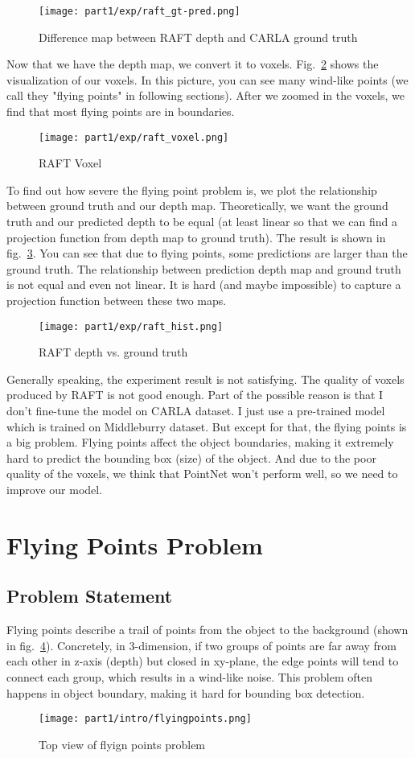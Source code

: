 \documentclass[12pt]{article}
\begin{document}
\begin{figure}[H]
    \centering
    \texttt{[image: part1/exp/raft\_gt-pred.png]}
    \caption{Difference map between RAFT depth and CARLA ground truth}
    \label{raft_gt-pred}
\end{figure}
Now that we have the depth map, we convert it to voxels. Fig.~\ref{raft_voxel} shows the visualization of our voxels. In this picture, you can see many wind-like points (we call they "flying points" in following sections). After we zoomed in the voxels, we find that most flying points are in boundaries.
\begin{figure}[H]
    \centering
    \texttt{[image: part1/exp/raft\_voxel.png]}
    \caption{RAFT Voxel}
    \label{raft_voxel}
\end{figure}
To find out how severe the flying point problem is, we plot the relationship between ground truth and our depth map. Theoretically, we want the ground truth and our predicted depth to be equal (at least linear so that we can find a projection function from depth map to ground truth). The result is shown in fig.~\ref{raft_hist}. You can see that due to flying points, some predictions are larger than the ground truth. The relationship between prediction depth map and ground truth is not equal and even not linear. It is hard (and maybe impossible) to capture a projection function between these two maps.
\begin{figure}[H]
    \centering
    \texttt{[image: part1/exp/raft\_hist.png]}
    \caption{RAFT depth vs. ground truth}
    \label{raft_hist}
\end{figure}
Generally speaking, the experiment result is not satisfying. The quality of voxels produced by RAFT is not good enough. Part of the possible reason is that I don’t fine-tune the model on CARLA dataset. I just use a pre-trained model which is trained on Middleburry dataset. But except for that, the flying points is a big problem. Flying points affect the object boundaries, making it extremely hard to predict the bounding box (size) of the object. And due to the poor quality of the voxels, we think that PointNet won't perform well, so we need to improve our model.
\section{Flying Points Problem}
\subsection{Problem Statement}
Flying points describe a trail of points from the object to the background (shown in fig.~\ref{flyingpoints}). Concretely, in 3-dimension, if two groups of points are far away from each other in z-axis (depth) but closed in xy-plane, the edge points will tend to connect each group, which results in a wind-like noise. This problem often happens in object boundary, making it hard for bounding box detection.
\begin{figure}[H]
    \centering
    \texttt{[image: part1/intro/flyingpoints.png]}
    \caption{Top view of flyign points problem}
    \label{flyingpoints}
\end{figure}
\end{document}
